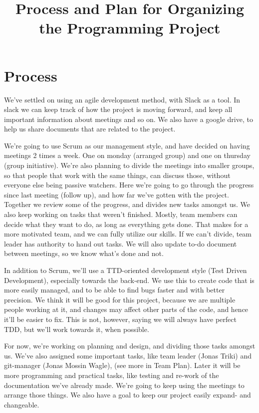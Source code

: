\documentclass{article}
\title{Process and Plan for Organizing the Programming Project}
\date{}
\begin{document}
\maketitle
\section*{Process}
We’ve settled on using an agile development method, with Slack as a tool. In slack we can keep track of how the project is moving forward, and keep all important information about meetings and so on. We also have a google drive, to help us share documents that are related to the project.

We’re going to use Scrum as our management style, and have decided on having meetings 2 times a week. One on monday (arranged group) and one on thursday (group initiative). We’re also planning to divide the meetings into smaller groups, so that people that work with the same things, can discuss those, without everyone else being passive watchers.
Here we’re going to go through the progress since last meeting (follow up), and how far we’ve gotten with the project. Together we review some of the progress, and divides new tasks amongst us. We also keep working on tasks that weren’t finished. Mostly, team members can decide what they want to do, as long as everything gets done. That makes for a more motivated team, and we can fully utilize our skills. If we can't divide, team leader has authority to hand out tasks. We will also update to-do document between meetings, so we know what's done and not.

In addition to Scrum, we'll use a TTD-oriented development style (Test Driven Development), especially towards the back-end. We use this to create code that is more easily managed, and to be able to find bugs faster and with better precision. We think it will be good for this project, because we are multiple people working at it, and changes may affect other parts of the code, and hence it'll be easier to fix. This is not, however, saying we will always have perfect TDD, but we'll work towards it, when possible.

For now, we’re working on planning and design, and dividing those tasks amongst us. We’ve also assigned some important tasks, like team leader (Jonas Triki) and git-manager (Jonas Mossin Wagle), (see more in Team Plan). Later it will be more programming and practical tasks, like testing and re-work of the documentation we’ve already made. We’re going to keep using the meetings to arrange those things. We also have a goal to keep our project easily expand- and changeable.
\end{document}
